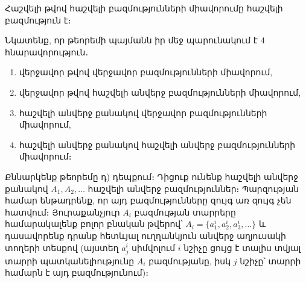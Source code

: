\documentclass[./main.tex]{subfiles}
\begin{document}
\begin{theorem}\label{ch3thm3}
Հաշվելի թվով հաշվելի բազմությունների միավորումը հաշվելի բազ\-մու\-թյուն է։
\par Նկատենք, որ թեորեմի պայմանն իր մեջ պարունակում է 4 հնարավորություն․
\begin{enumerate}
    \item[ա)] վերջավոր թվով վերջավոր բազմությունների միավորում,
    \item[բ)] վերջավոր թվով հաշվելի անվերջ բազմությունների միավորում,
    \item[գ)] հաշվելի անվերջ քանակով վերջավոր բազմությունների միավորում,
    \item[դ)] հաշվելի անվերջ քանակով հաշվելի անվերջ բազմությունների միավորում։
\end{enumerate}
\end{theorem}
\par Քննարկենք թեորեմը դ) դեպքում։ Դիցուք ունենք հաշվելի անվերջ քանակով $A_1,A_2,\dots$ հաշվելի անվերջ բազմություններ։ Պարզության համար ենթադրենք, որ այդ բազմությունները զույգ առ զույգ չեն հատվում։ Յուրաքանչյուր $A_i$ բազմության տարրերը համարակալենք բոլոր բնական թվերով՝ $A_i=\{a_1^i,a_2^i,a_3^i,\dots\}$ և դասավո\-րենք դրանք հետևյալ ուղղանկյուն անվերջ աղյուսակի տողերի տեսքով (այստեղ $a_j^i$ սիմվոլում $i$ նշիչը ցույց է տալիս տվյալ տարրի պատկանելիությունը $A_i$ բազմությա\-նը, իսկ $j$ նշիչը՝ տարրի համարն է այդ բազմությունում)։\\
\begin{center}
\end{center}
\end{document}
